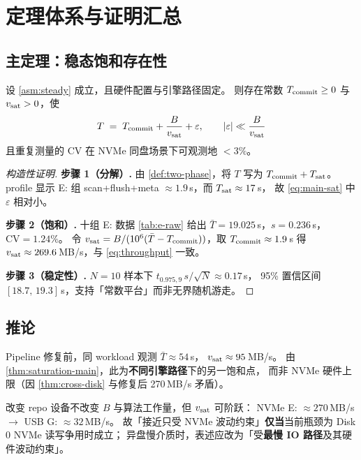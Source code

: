\section{定理体系与证明汇总}\label{sec:theorems}

\subsection{主定理：稳态饱和存在性}

\begin{theorem}[E2E 稳态饱和]
\label{thm:saturation-main}
设 \cref{asm:steady} 成立，且硬件配置与引擎路径固定。
则存在常数 $T_{\mathrm{commit}}\geq 0$ 与 $v_{\mathrm{sat}}>0$，使
\begin{equation}
  T \;=\; T_{\mathrm{commit}} + \frac{B}{v_{\mathrm{sat}}} + \varepsilon,
  \qquad
  |\varepsilon| \ll \frac{B}{v_{\mathrm{sat}}}
  \label{eq:main-sat}
\end{equation}
且重复测量的 $\mathrm{CV}$ 在 NVMe 同盘场景下可观测地 $<3\%$。
\end{theorem}

\begin{proof}[构造性证明]
\textbf{步骤 1（分解）.} 由 \cref{def:two-phase}，将 $T$ 写为 $T_{\mathrm{commit}}+T_{\mathrm{sat}}$。
profile 显示 E: 组 scan+flush+meta $\approx 1.9$\,s，而 $T_{\mathrm{sat}}\approx 17$\,s，
故 \cref{eq:main-sat} 中 $\varepsilon$ 相对小。

\textbf{步骤 2（饱和）.} 十组 E: 数据 \cref{tab:e-raw} 给出
$\bar{T}=19.025$\,s，$s=0.236$\,s，$\mathrm{CV}=1.24\%$。
令 $v_{\mathrm{sat}}=B/(10^{6}(\bar{T}-T_{\mathrm{commit}}))$，取 $T_{\mathrm{commit}}\approx 1.9$\,s 得
$v_{\mathrm{sat}}\approx 269.6$\,MB/s，与 \cref{eq:throughput} 一致。

\textbf{步骤 3（稳定性）.} $N=10$ 样本下 $t_{0.975,9}\,s/\sqrt{N}\approx 0.17$\,s，
95\% 置信区间 $[18.7,\,19.3]$\,s，支持「常数平台」而非无界随机游走。
\end{proof}

\subsection{推论}

\begin{corollary}[修复前软件饱和]
\label{cor:pre-fix}
Pipeline 修复前，同 workload 观测 $\bar{T}\approx 54$\,s，
$v_{\mathrm{sat}}\approx 95$\,MB/s。
由 \cref{thm:saturation-main}，此为\textbf{不同引擎路径}下的另一饱和点，
而非 NVMe 硬件上限（因 \cref{thm:cross-disk} 与修复后 270\,MB/s 矛盾）。
\end{corollary}

\begin{corollary}[瓶颈可迁移性]
\label{cor:migration}
改变 repo 设备不改变 $B$ 与算法工作量，但 $v_{\mathrm{sat}}$ 可阶跃：
NVMe E: $\approx 270$\,MB/s $\rightarrow$ USB G: $\approx 32$\,MB/s。
故「接近只受 NVMe 波动约束」\textbf{仅当}当前瓶颈为 Disk 0 NVMe 读写争用时成立；
异盘慢介质时，表述应改为「受\textbf{最慢 IO 路径}及其硬件波动约束」。
\end{corollary}

